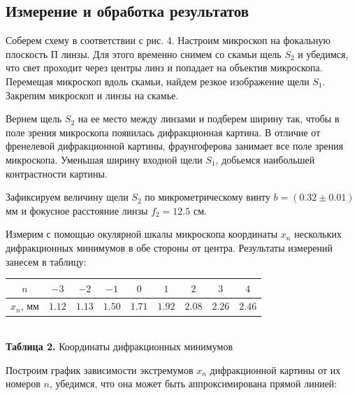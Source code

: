 \documentclass[a4paper,12pt]{article} %
\begin{document}
\subsection{Измерение и обработка результатов}

\hfill \break Соберем схему в соответствии с рис. 4. Настроим микроскоп на фокальную плоскость П линзы. Для этого временно снимем со скамьи щель $S_2$ и убедимся, что свет проходит через центры линз и попадает на объектив микроскопа. Перемещая микроскоп вдоль скамьи, найдем резкое изображение щели $S_1$. Закрепим микроскоп и линзы на скамье.

\hfill \break Вернем щель $S_2$ на ее место между линзами и подберем ширину так, чтобы в поле зрения микроскопа появилась дифракционная картина. В отличие от френелевой дифракционной картины, фраунгоферова занимает все поле зрения микроскопа. Уменьшая ширину входной щели $S_1$, добьемся наибольшей контрастности картины.

\hfill \break Зафиксируем величину щели $S_2$ по микрометрическому винту $b = (0.32 \pm 0.01)$ мм и фокусное расстояние линзы $f_2 = 12.5$ см. 

\hfill \break Измерим с помощью окулярной шкалы микроскопа координаты $x_{n}$ нескольких дифракционных минимумов в обе стороны от центра. Результаты измерений занесем в таблицу:

\begin{center}
\begin{tabular}{|c|c|c|c|c|c|c|c|c|}\hline
$ n $ & $ -3 $ & $ -2 $ & $ -1 $ & $ 0 $ & $ 1 $ & $ 2 $ & $ 3 $ & $ 4 $ \\\hline
$ x_{n} $, мм & $ 1.12 $ & $ 1.13 $ & $ 1.50 $ & $ 1.71 $ & $ 1.92 $ & $ 2.08 $ & $ 2.26 $ & $ 2.46 $ \\\hline
\end{tabular} \\
\hfill \break \textbf {Таблица 2.} Координаты дифракционных минимумов \\
\end{center}

\hfill \break Построим график зависимости экстремумов $x_{n}$ дифракционной картины от их номеров $n$, убедимся, что она может быть аппроксимирована прямой линией:
\end{document}
